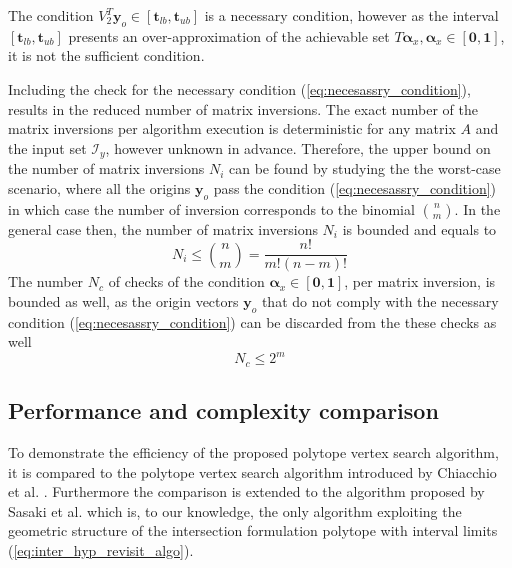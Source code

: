 The condition $V_2^T\bm{y}_o \in [\bm{t}_{lb}, \bm{t}_{ub}] $ is a necessary condition, however as the interval $[\bm{t}_{lb}, \bm{t}_{ub}]$ presents an over-approximation of the achievable set $T\bm{\alpha}_x, \bm{\alpha}_x\in[\bm{0}, \bm{1}]$, it is not the sufficient condition.

Including the check for the necessary condition (\ref{eq:necesassry_condition}), results in the reduced number of matrix inversions. The exact number of the matrix inversions per algorithm execution is deterministic for any matrix $A$ and the input set $\mathcal{I}_y$, however unknown in advance. Therefore, the upper bound on the number of matrix inversions $N_i$ can be found by studying the the worst-case scenario, where all the origins $\bm{y}_o$ pass the condition (\ref{eq:necesassry_condition}) in which case the number of inversion corresponds to the binomial $\binom{n}{m}$. In the general case then, the number of matrix inversions $N_i$ is bounded and equals to  
$$N_i\leq\binom{n}{m}=\frac{n!}{m!(n-m)!}$$
The number $N_c$ of checks of the condition $\bm{\alpha}_x \in [\bm{0},\bm{1}]$, per matrix inversion, is bounded as well, as the origin vectors $\bm{y}_o$ that do not comply with the necessary condition (\ref{eq:necesassry_condition}) can be discarded from the these checks as well
$$
N_c\leq2^m
$$

\subsection{Performance and complexity comparison}\label{sec:complexity}
To demonstrate the efficiency of the proposed polytope vertex search algorithm, it is compared to the polytope vertex search algorithm introduced by Chiacchio et al. \cite{chiacchio_evaluation_1996}. Furthermore the comparison is extended to the algorithm proposed by Sasaki et al. \cite{sasaki_vertex_nodate} which is, to our knowledge, the only algorithm exploiting the geometric structure of the intersection formulation polytope with interval limits (\ref{eq:inter_hyp_revisit_algo}).


